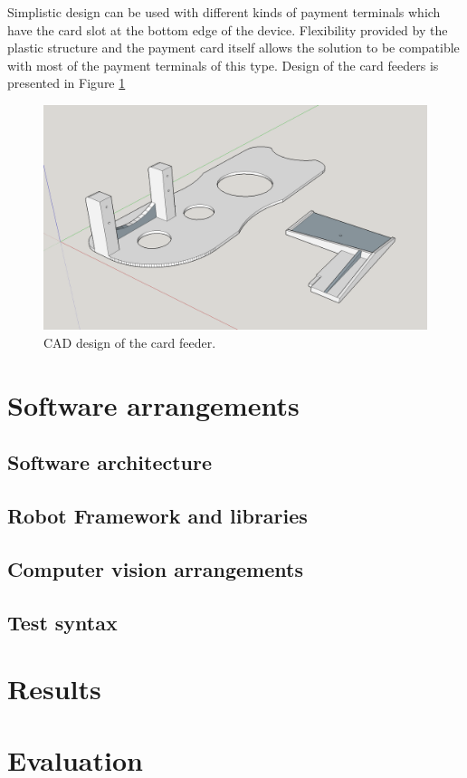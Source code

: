 Simplistic design can be used with different kinds of payment terminals which have the card slot at the bottom edge of the device. Flexibility provided by the plastic structure and the payment card itself allows the solution to be compatible with most of the payment terminals of this type. Design of the card feeders is presented in Figure \ref{fig:card_feeder}

\begin{figure}[ht]
  \begin{center}
    \includegraphics[width=12cm]{images/card_feeder.png}
    \caption{CAD design of the card feeder.}
    \label{fig:card_feeder}
  \end{center}
\end{figure}
\FloatBarrier

\section{Software arrangements}
\label{section:Software arrangements}

\subsection{Software architecture}
\label{subsection:Software architecture}

\subsection{Robot Framework and libraries}
\label{subsection:Robot Framework and libraries}

\subsection{Computer vision arrangements}
\label{subsection:Computer vision arrangements}

\subsection{Test syntax}
\label{subsection:Test syntax}


\section{Results}
\label{section:Results}

\section{Evaluation}
\label{section:Evaluation}